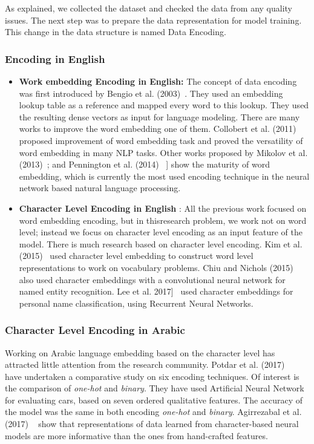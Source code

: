 As explained, we collected the dataset and checked the data from any quality issues. The next step was to prepare the data representation for model training. This change in the data structure is named Data Encoding.

\subsubsection{Encoding in English}

\begin{itemize}
 \item \textbf{Work embedding Encoding in English:} The concept of data encoding was first introduced by Bengio et al. (2003)~\cite{Bengio2003}. They used an embedding lookup table as a reference and mapped every word to this lookup. They used the resulting dense vectors as input for language modeling. There are many works to improve the word embedding one of them. Collobert et al. (2011)~\cite{Collobert_2011} proposed improvement of word embedding task and proved the versatility of word embedding in many NLP tasks. Other works proposed by Mikolov et al. (2013)~\cite{Mikolov_2013}; and Pennington et al. (2014)~\cite{Pennington_2014} ] show the maturity of word embedding, which is currently the most used encoding technique in the neural network based natural language processing.

 \item \textbf{Character Level Encoding in English} : All the previous work focused on word embedding encoding, but in thisresearch problem, we work not on word level; instead we focus on character level encoding as an input feature of the model. There is much research based on character level encoding. Kim et al. (2015)~\cite{Kim_2015} used character level embedding to construct word level representations to work on vocabulary problems. Chiu and Nichols (2015)~\cite{Chiu_2015} also used character embeddings with a convolutional neural network for named entity recognition. Lee et al. 2017]~\cite{ijcai_2017} used character embeddings for personal name classification, using Recurrent Neural Networks.

\end{itemize}

\subsubsection{Character Level Encoding in Arabic}\label{sec:Char_Level_Arabic}

Working on Arabic language embedding based on the character level has attracted little attention from the research community. Potdar et al. (2017) ~\cite{Potdar_2017} have undertaken a comparative study on six encoding techniques. Of interest is the comparison of \textit{one-hot} and \textit{binary}. They have used Artificial Neural Network for evaluating cars, based on seven ordered qualitative features. The accuracy of the model was the same in both encoding \textit{one-hot} and \textit{binary}. Agirrezabal et al. (2017) ~\cite{Agirrezabal_2017} show that representations of data learned from character-based neural models are more informative than the ones from hand-crafted features.

